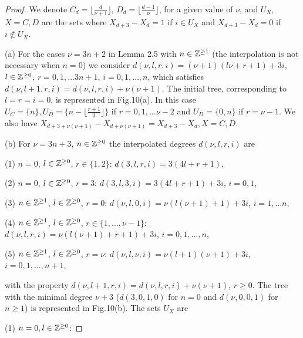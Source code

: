 \documentclass{birkjour_t2}
\theoremstyle{definition}
\theoremstyle{remark}
\numberwithin{equation}{section}
\begin{document}
           \begin{proof}     
               We denote  $C_{d}= \Big \lfloor \frac{d}{\nu+1} \Big \rfloor$, $D_{d}=\Big \lfloor \frac{d-1}{\nu} \Big \rfloor$, for a given value of $\nu$, and 
$U_{X}$, $X=C, D$ are the sets where $X_{d+3}- X_{d}=1$ if $i \in U_{X}$  and  $X_{d+3}- X_{d}=0$ if $i \notin U_{X}$. 

(a) For the cases  $\nu= 3n+2$ in Lemma 2.5 with $n \in {\Bbb{Z}}^{\geq 1}$ (the interpolation is not necessary when $n=0$) we consider $d(\nu, l, r, i)=(\nu+1)(l\nu + r+1) + 3i$, $l \in {\Bbb{Z}}^{\geq 0}$, $r=0,1,\dots 3n+1$, $i=0,1,\dots, n$, which satisfies $d(\nu, l+1, r, i)= d(\nu, l, r, i)+ \nu(\nu+1)$. The initial tree, corresponding to $l=r=i=0$, is represented in Fig.10(a). In this case $U_{C}=\{n\}, U_{D}=\{n-\Big \lfloor\frac{r+1}{3} \Big \rfloor \}$ if $r=0, 1, \dots \nu -2$ and $U_{D}=\{0, n\}$ if $r = \nu -1$. We also have $X_{d+3+\nu(\nu+1)}- X_{d+\nu(\nu+1)} = X_{d+3}- X_{d}, X=C, D$. 

 \bigskip\par
    
        (b)  For $\nu= 3n+3$, $n \in {\Bbb{Z}}^{\geq 0}$  the interpolated degrees $d(\nu, l, r, i)$ are
      \bigskip\par             
                 (1)  $n=0$, $l \in {\Bbb{Z}}^{\geq 0}$, $r \in \{1,2\}$: $d(3, l, r, i)= 3(4l+r+1)$,
                 
                 (2)  $n=0$, $l \in {\Bbb{Z}}^{\geq 0}$, $r=3$: $d(3, l, 3, i)= 3(4l+r+1)+3i$,  $i=0,1$, 
                 
                  (3) $n \in {\Bbb{Z}}^{\geq 1}$, $l \in {\Bbb{Z}}^{\geq 0}$, $r=0$: $d(\nu, l, 0, i)=\nu(l(\nu +1)+1)+ 3i$, $i=1,\dots n$,
                  
                   (4) $n \in {\Bbb{Z}}^{\geq 1}$, $l \in {\Bbb{Z}}^{\geq 0}$, $r \in \{1, \dots , \nu-1\}$: $d(\nu, l, r, i)=\nu(l(\nu +1)+r+1)+ 3i$, $i=0,1,\dots, n$, 
                   
                    (5) $n \in {\Bbb{Z}}^{\geq 1}$, $l \in {\Bbb{Z}}^{\geq 0}$, $r= \nu$: $d(\nu, l, \nu, i)=\nu(l+1)(\nu +1)+ 3i$, $i=0,1,\dots, n+1$, 
                   
                   
       \bigskip\par            
  \noindent               
 with the property $d(\nu, l+1, r, i)=d(\nu, l, r, i)+ \nu(\nu+1)$, $r \geq 0$.  The tree with the minimal degree $\nu+3$ ($d(3, 0, 1, 0)$ for $n=0$ and $d(\nu, 0, 0, 1)$ for  $n \geq 1$) is represented in Fig.10(b). The sets $U_{X}$ are 
      \bigskip\par 
    (1)  $n=0, l \in {\Bbb{Z}}^{\geq 0}$: 
    

\end{proof}
\end{document}
